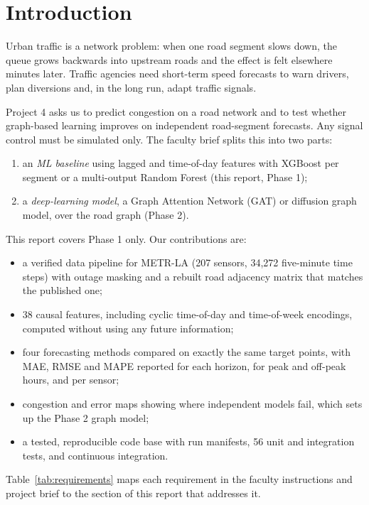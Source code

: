 \documentclass[conference]{IEEEtran}
\begin{document}
\section{Introduction}
Urban traffic is a network problem: when one road segment slows down, the queue grows backwards into upstream roads and the effect is felt elsewhere minutes later. Traffic agencies need short-term speed forecasts to warn drivers, plan diversions and, in the long run, adapt traffic signals.

Project 4 asks us to predict congestion on a road network and to test whether graph-based learning improves on independent road-segment forecasts. Any signal control must be simulated only. The faculty brief splits this into two parts:
\begin{enumerate}
\item an \emph{ML baseline} using lagged and time-of-day features with XGBoost per segment or a multi-output Random Forest (this report, Phase 1);
\item a \emph{deep-learning model}, a Graph Attention Network (GAT) or diffusion graph model, over the road graph (Phase 2).
\end{enumerate}

This report covers Phase 1 only. Our contributions are:
\begin{itemize}
\item a verified data pipeline for METR-LA (207 sensors, 34,272 five-minute time steps) with outage masking and a rebuilt road adjacency matrix that matches the published one;
\item 38 causal features, including cyclic time-of-day and time-of-week encodings, computed without using any future information;
\item four forecasting methods compared on exactly the same target points, with MAE, RMSE and MAPE reported for each horizon, for peak and off-peak hours, and per sensor;
\item congestion and error maps showing where independent models fail, which sets up the Phase 2 graph model;
\item a tested, reproducible code base with run manifests, 56 unit and integration tests, and continuous integration.
\end{itemize}

Table~\ref{tab:requirements} maps each requirement in the faculty instructions and project brief to the section of this report that addresses it.
\end{document}
